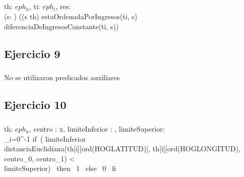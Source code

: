 \documentclass[a4paper]{article}
\begin{document}
\subparagraph{}
	{\In th: $eph_{h}$, \In ti: $eph_{i}$, \In res:  }
	{\\\indent\indent\indent
	(\forall s: ) ((s \subseteq th) \wedge estaOrdenadaPorIngresos(ti, s) 
	\\\indent\indent\indent
	\wedge diferenciaDeIngresosConstante(ti, s)) \Then 
	 \leq {}\\
}

\subsection{Ejercicio 9}
\subparagraph{}
No se utilizaron predicados auxiliares

\subsection{Ejercicio 10}
\subparagraph{}
{\In th: $eph_{h}$, \In centro : \ent x\ent, \In limiteInferior : \ent, \In limiteSuperior: \ent}
{\ent}
{\\\indent\indent\indent
	\sum_{i=0}^{-1} if \,( limiteInferior \leq
	\\\indent\indent\indent\indent\indent\indent
	distanciaEuclidiana(th[i][ord(HOGLATITUD)], th[i][ord(HOGLONGITUD), centro_0, centro_1) <
	\\\indent\indent\indent\indent\indent\indent
	limiteSuperior) \, then \, 1 \, else \, 0 \, fi
}

\subparagraph{}


\subparagraph{}

\subparagraph{}
\end{document}
